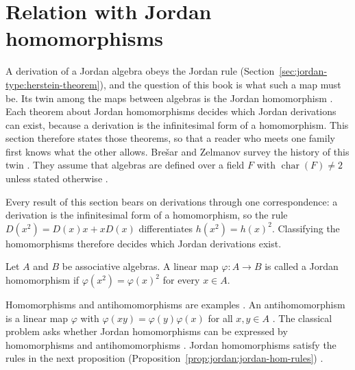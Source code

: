\section{Relation with Jordan homomorphisms}\label{sec:jordan-type:jordan-homomorphisms}

A derivation of a Jordan algebra obeys the Jordan rule
(Section~\ref{sec:jordan-type:herstein-theorem}), and the question of this
book is what such a map must be. Its twin among the maps
between algebras is the Jordan homomorphism
\cite[Abstract, p.~203]{BresarZelmanov2025}. Each theorem about Jordan
homomorphisms decides which Jordan derivations can exist, because a derivation
is the infinitesimal form of a homomorphism. This section therefore states
those theorems, so that a reader who meets one family first knows what the
other allows. %
Brešar and Zelmanov survey the history of
this twin \cite[Abstract, p.~203]{BresarZelmanov2025}. They assume that
algebras are defined over a field $F$ with $\operatorname{char}(F)\neq2$
unless stated otherwise \cite[Section~1, p.~203]{BresarZelmanov2025}.

Every result of this section bears on derivations through one correspondence:
a derivation is the infinitesimal form of a homomorphism, so the rule
$D(x^2)=D(x)x+xD(x)$ differentiates $h(x^2)=h(x)^2$. Classifying the
homomorphisms therefore decides which Jordan derivations exist.

\begin{definition}\label{def:jordan:jordan-hom}
Let $A$ and $B$ be associative algebras. A linear map $\varphi\colon A\to B$ is called a Jordan
homomorphism if $\varphi(x^{2})=\varphi(x)^{2}$ for every $x\in A$.
\end{definition}

Homomorphisms and antihomomorphisms are examples
\cite[p.~204]{BresarZelmanov2025}. An antihomomorphism is a linear map
$\varphi$ with $\varphi(xy)=\varphi(y)\varphi(x)$ for all $x,y\in A$
\cite[p.~204]{BresarZelmanov2025}. The classical problem asks whether Jordan
homomorphisms can be expressed by homomorphisms and antihomomorphisms
\cite[p.~204]{BresarZelmanov2025}. Jordan homomorphisms satisfy the rules in
the next proposition (Proposition~\ref{prop:jordan:jordan-hom-rules})
\cite[p.~209]{BresarZelmanov2025}.

